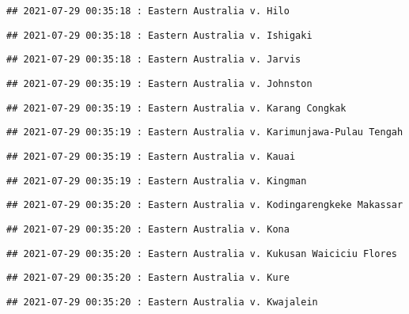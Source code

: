 \documentclass[
]{article}
\begin{document}
\begin{verbatim}
## 2021-07-29 00:35:18 : Eastern Australia v. Hilo
\end{verbatim}

\begin{verbatim}
## 2021-07-29 00:35:18 : Eastern Australia v. Ishigaki
\end{verbatim}

\begin{verbatim}
## 2021-07-29 00:35:18 : Eastern Australia v. Jarvis
\end{verbatim}

\begin{verbatim}
## 2021-07-29 00:35:19 : Eastern Australia v. Johnston
\end{verbatim}

\begin{verbatim}
## 2021-07-29 00:35:19 : Eastern Australia v. Karang Congkak
\end{verbatim}

\begin{verbatim}
## 2021-07-29 00:35:19 : Eastern Australia v. Karimunjawa-Pulau Tengah
\end{verbatim}

\begin{verbatim}
## 2021-07-29 00:35:19 : Eastern Australia v. Kauai
\end{verbatim}

\begin{verbatim}
## 2021-07-29 00:35:19 : Eastern Australia v. Kingman
\end{verbatim}

\begin{verbatim}
## 2021-07-29 00:35:20 : Eastern Australia v. Kodingarengkeke Makassar
\end{verbatim}

\begin{verbatim}
## 2021-07-29 00:35:20 : Eastern Australia v. Kona
\end{verbatim}

\begin{verbatim}
## 2021-07-29 00:35:20 : Eastern Australia v. Kukusan Waiciciu Flores
\end{verbatim}

\begin{verbatim}
## 2021-07-29 00:35:20 : Eastern Australia v. Kure
\end{verbatim}

\begin{verbatim}
## 2021-07-29 00:35:20 : Eastern Australia v. Kwajalein
\end{verbatim}
\end{document}
